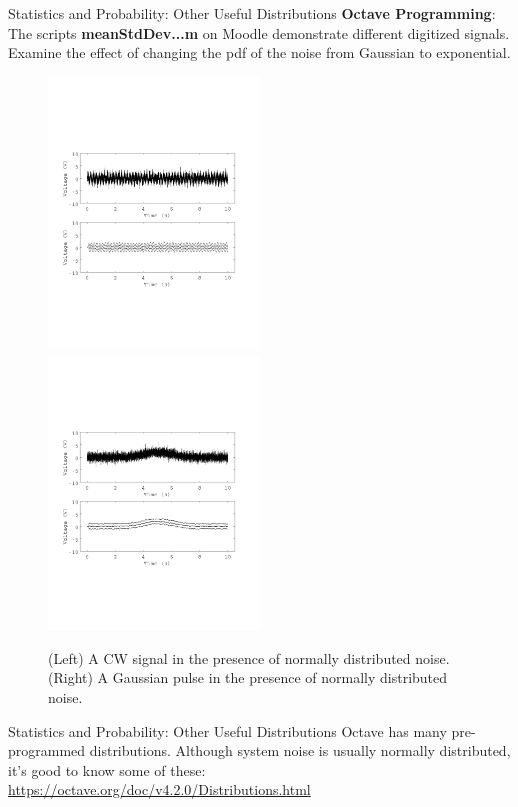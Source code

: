 \documentclass{beamer}
\begin{document}
\begin{frame}[fragile]{Statistics and Probability: Other Useful Distributions}
\small
\textbf{Octave Programming}: The scripts \textbf{meanStdDev...m} on Moodle demonstrate different digitized signals.  Examine the effect of changing the pdf of the noise from Gaussian to exponential.
\begin{figure}
\centering
\includegraphics[width=0.5\textwidth,trim=0cm 6cm 0cm 6cm,clip=true]{figures/meanStdDev_plusCW.pdf}
\includegraphics[width=0.5\textwidth,trim=0cm 6cm 0cm 6cm,clip=true]{figures/meanStdDev_plusGaussian.pdf}
\caption{\label{fig:dropin} (Left) A CW signal in the presence of normally distributed noise. (Right) A Gaussian pulse in the presence of normally distributed noise.}
\end{figure}
\end{frame}

\begin{frame}[fragile]{Statistics and Probability: Other Useful Distributions}
\small
Octave has many pre-programmed distributions.  Although system noise is usually normally distributed, it's good to know some of these: \\ \vspace{0.5cm}
\url{https://octave.org/doc/v4.2.0/Distributions.html}
\end{frame}
\end{document}
